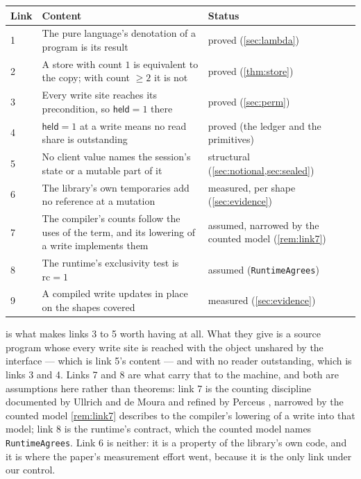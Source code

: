 \documentclass[11pt,a4paper]{article}
\theoremstyle{definition}
\theoremstyle{plain}
\newcommand{\rc}{\mathrm{rc}}
\newcommand{\held}{\mathsf{held}}
\newcommand{\code}[1]{\texttt{#1}}
\begin{document}
\begin{table}[ht]
\centering
\small
\begin{tabular}{@{}p{}p{}p{}@{}}
\toprule
Link & Content & Status \\
\midrule
1 & The pure language's denotation of a program is its result & proved (\cref{sec:lambda}) \\
2 & A store with count $1$ is equivalent to the copy; with count $\ge 2$ it is not & proved (\cref{thm:store}) \\
3 & Every write site reaches its precondition, so $\held = 1$ there & proved (\cref{sec:perm}) \\
4 & $\held = 1$ at a write means no read share is outstanding & proved (the ledger and the primitives) \\
5 & No client value names the session's state or a mutable part of it & structural (\cref{sec:notional,sec:sealed}) \\
6 & The library's own temporaries add no reference at a mutation & measured, per shape (\cref{sec:evidence}) \\
7 & The compiler's counts follow the uses of the term, and its lowering of a write implements them & assumed, narrowed by the counted model (\cref{rem:link7}) \\
8 & The runtime's exclusivity test is $\rc = 1$ & assumed (\code{RuntimeAgrees}) \\
9 & A compiled write updates in place on the shapes covered & measured (\cref{sec:evidence}) \\
\bottomrule
\end{tabular}
\end{table}

 is what makes links 3 to 5 worth having at all. What they give
is a source program whose every write site is reached with the object
unshared by the interface --- which is link 5's content --- and with no reader
outstanding, which is links 3 and 4. Links 7 and 8 are what carry that to the
machine, and both are assumptions here rather than theorems: link 7 is the
counting discipline documented by Ullrich and de Moura
\cite{ullrich2019counting} and refined by Perceus \cite{reinking2021perceus},
narrowed by the counted model \cref{rem:link7} describes to the compiler's
lowering of a write into that model; link 8 is the runtime's contract, which the
counted model names \code{RuntimeAgrees}. Link 6 is neither: it is a property of
the library's own code, and it is where the paper's measurement effort went,
because it is the only link under our control.
\end{document}
